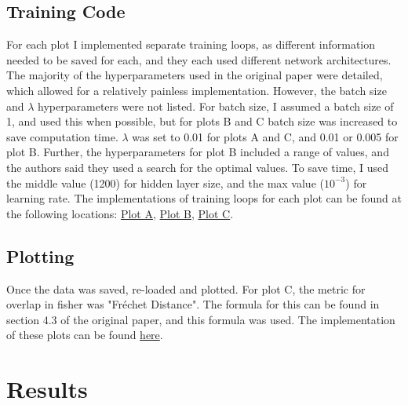 \documentclass{article}
\begin{document}
\subsection{Training Code}

For each plot I implemented separate training loops, as different information needed to be saved for each, and they each used different network architectures. The majority of the hyperparameters used in the original paper were detailed, which allowed for a relatively painless implementation. However, the batch size and $\lambda$ hyperparameters were not listed. For batch size, I assumed a batch size of 1, and used this when possible, but for plots B and C batch size was increased to save computation time. $\lambda$ was set to 0.01 for plots A and C, and 0.01 or 0.005 for plot B. Further, the hyperparameters for plot B included a range of values, and the authors said they used a search for the optimal values. To save time, I used the middle value (1200) for hidden layer size, and the max value ($10^{-3}$) for learning rate. The implementations of training loops for each plot can be found at the following locations: \href{}{Plot A}, \href{}{Plot B}, \href{}{Plot C}. 

\subsection{Plotting}

Once the data was saved, re-loaded and plotted. For plot C, the metric for overlap in fisher was "Fr\' echet Distance". The formula for this can be found in section 4.3 of the original paper, and this formula was used. The implementation of these plots can be found \href{}{here}.

\section{Results}
\end{document}
